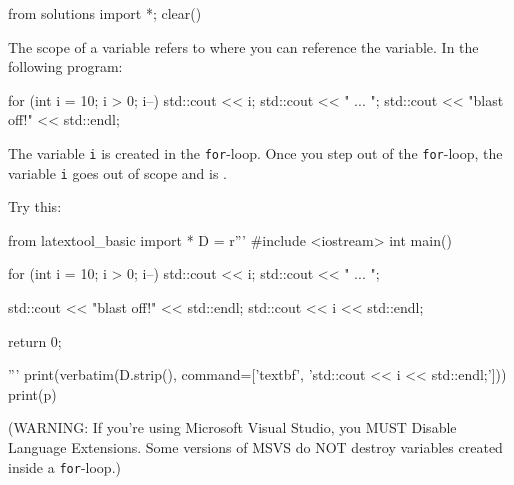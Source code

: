 \begin{python0}
from solutions import *; clear()
\end{python0}

The scope of a variable refers to where you can reference the variable.
In the following program:
\begin{console}
for (int i = 10; i > 0; i--)
{   
    std::cout << i;
    std::cout << " ... ";
}
std::cout << "blast off!" << std::endl;
\end{console}

The variable \texttt{i} is created in the \texttt{for}-loop. Once you step
out of the \texttt{for}-loop, the variable \texttt{i} goes out of scope and
is .
\begin{center}
\end{center}
Try this:
\sidenote
{
}
\begin{python}
from latextool_basic import *
D = r'''
#include <iostream>
int main()
{   
    for (int i = 10; i > 0; i--)
    {   
        std::cout << i;
        std::cout << " ... ";
    }

    std::cout << "blast off!" << std::endl;
    std::cout << i << std::endl;

    return 0;
}
'''
print(verbatim(D.strip(), command=['textbf', 'std::cout << i << std::endl;']))
print(p)
\end{python}


(WARNING: If you're using Microsoft Visual Studio, you
MUST Disable Language Extensions. Some versions of MSVS do NOT destroy
variables created inside a \texttt{for}-loop.)

